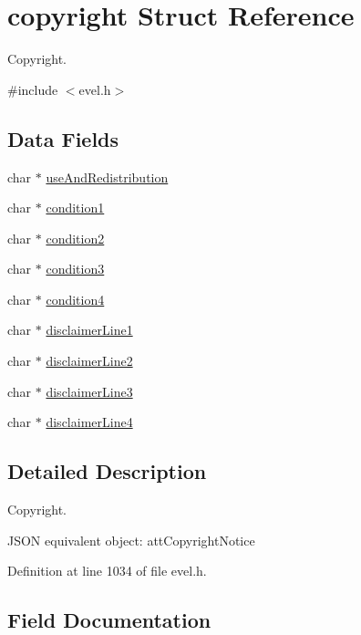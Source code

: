 \hypertarget{structcopyright}{}\section{copyright Struct Reference}
\label{structcopyright}


Copyright.  




{\ttfamily \#include $<$evel.\+h$>$}

\subsection*{Data Fields}
\begin{DoxyCompactItemize}
\item 
char $\ast$ \hyperlink{structcopyright_ad8f21ad8c30c034839fbd41340439a87}{use\+And\+Redistribution}
\item 
char $\ast$ \hyperlink{structcopyright_af83df7151d39ca289035a306719bdeca}{condition1}
\item 
char $\ast$ \hyperlink{structcopyright_aec75dccb61ec6069ab97b0e57d790a2e}{condition2}
\item 
char $\ast$ \hyperlink{structcopyright_aab08f4c8d2ecbedbe81584a37a0cec2c}{condition3}
\item 
char $\ast$ \hyperlink{structcopyright_a4290d46b5c4ce72b712df3949081091e}{condition4}
\item 
char $\ast$ \hyperlink{structcopyright_a8b4cae8b24b51509a3f998d164699ca9}{disclaimer\+Line1}
\item 
char $\ast$ \hyperlink{structcopyright_a3bf2ec025b45fb514675edee7472779c}{disclaimer\+Line2}
\item 
char $\ast$ \hyperlink{structcopyright_ad44f81bfbe8b699f6cdbf898b7a85def}{disclaimer\+Line3}
\item 
char $\ast$ \hyperlink{structcopyright_ab0d41c9fae081c4e2bbfd32da2e709dd}{disclaimer\+Line4}
\end{DoxyCompactItemize}


\subsection{Detailed Description}
Copyright. 

J\+S\+ON equivalent object\+: att\+Copyright\+Notice 

Definition at line 1034 of file evel.\+h.



\subsection{Field Documentation}
\hypertarget{structcopyright_af83df7151d39ca289035a306719bdeca}{}\label{structcopyright_af83df7151d39ca289035a306719bdeca} 
